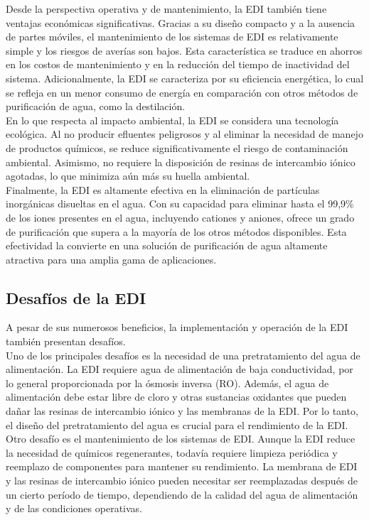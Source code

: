 Desde la perspectiva operativa y de mantenimiento, la EDI también tiene ventajas económicas significativas. Gracias a su diseño compacto y a la ausencia de partes móviles, el mantenimiento de los sistemas de EDI es relativamente simple y los riesgos de averías son bajos. Esta característica se traduce en ahorros en los costos de mantenimiento y en la reducción del tiempo de inactividad del sistema. Adicionalmente, la EDI se caracteriza por su eficiencia energética, lo cual se refleja en un menor consumo de energía en comparación con otros métodos de purificación de agua, como la destilación.\\

En lo que respecta al impacto ambiental, la EDI se considera una tecnología ecológica. Al no producir efluentes peligrosos y al eliminar la necesidad de manejo de productos químicos, se reduce significativamente el riesgo de contaminación ambiental. Asimismo, no requiere la disposición de resinas de intercambio iónico agotadas, lo que minimiza aún más su huella ambiental.\\

Finalmente, la EDI es altamente efectiva en la eliminación de partículas inorgánicas disueltas en el agua. Con su capacidad para eliminar hasta el 99,9\% de los iones presentes en el agua, incluyendo cationes y aniones, ofrece un grado de purificación que supera a la mayoría de los otros métodos disponibles. Esta efectividad la convierte en una solución de purificación de agua altamente atractiva para una amplia gama de aplicaciones.\\

\subsection{Desafíos de la EDI}
A pesar de sus numerosos beneficios, la implementación y operación de la EDI también presentan desafíos. \\

Uno de los principales desafíos es la necesidad de una pretratamiento del agua de alimentación. La EDI requiere agua de alimentación de baja conductividad, por lo general proporcionada por la ósmosis inversa (RO). Además, el agua de alimentación debe estar libre de cloro y otras sustancias oxidantes que pueden dañar las resinas de intercambio iónico y las membranas de la EDI. Por lo tanto, el diseño del pretratamiento del agua es crucial para el rendimiento de la EDI. \\

Otro desafío es el mantenimiento de los sistemas de EDI. Aunque la EDI reduce la necesidad de químicos regenerantes, todavía requiere limpieza periódica y reemplazo de componentes para mantener su rendimiento. La membrana de EDI y las resinas de intercambio iónico pueden necesitar ser reemplazadas después de un cierto período de tiempo, dependiendo de la calidad del agua de alimentación y de las condiciones operativas. \\

